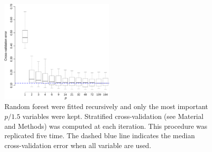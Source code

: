 \begin{figure}[h!]
  \centering    
    \includegraphics[width=0.5\textwidth]{figures/variable_elimination.pdf}
  \caption{
  Random forest were fitted recursively and only the most important $p/1.5$ variables were kept.
  Stratified cross-validation (see Material and Methods) was computed at each iteration. This procedure was replicated five time.
  The dashed blue line indicates the median cross-validation error when all variable are used.
  \label{fig:variable_elimination}
  }
\end{figure}
